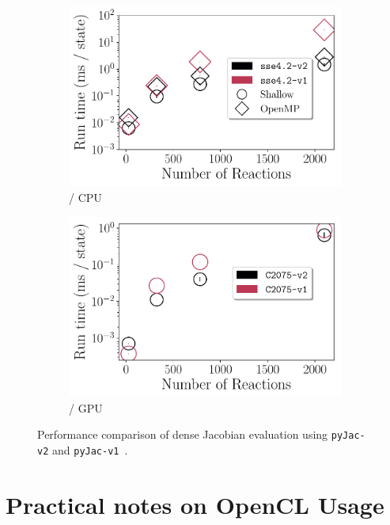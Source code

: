 \documentclass[12pt,number,sort&compress,preprint]{elsarticle}
\begin{document}
\begin{figure}[htbp]
   \centering
  \begin{subfigure}[t]{0.48\linewidth}
      \includegraphics[width=\textwidth]{v1_vs_v2.pdf}
      \caption{\sse/ CPU}
      \label{F:v1_vs_v2_cpu}
  \end{subfigure}
  \hfill
  \begin{subfigure}[t]{0.48\linewidth}
      \includegraphics[width=\textwidth]{v1_vs_v2_gpu.pdf}
      \caption{\gpuold/ GPU}
      \label{F:v1_vs_v2_gpu}
  \end{subfigure}
  \caption{Performance comparison of dense Jacobian evaluation using \texttt{pyJac-v2} and \texttt{pyJac-v1}~\cite{pyjac16}.}
  \label{F:v1_vs_v2}
\end{figure}

\section{Practical notes on OpenCL Usage}
\label{S:opencl}
\end{document}
